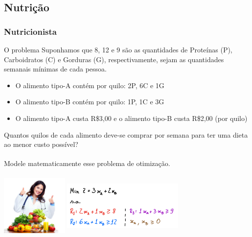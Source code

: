 \documentclass{beamer}
\begin{document}
\subsection{Nutrição}
\begin{frame}
	\frametitle{Nutricionista}
	\begin{block}{O problema}
		\scriptsize
		Suponhamos que 8, 12 e 9 são as quantidades de Proteínas (P), Carboidratos (C) e Gorduras (G), respectivamente, sejam as quantidades semanais mínimas de cada pessoa.
		\begin{itemize}
		\item O alimento tipo-A contém por quilo: 2P, 6C e 1G
		\item O alimento tipo-B contém por quilo: 1P, 1C e 3G
		\item O alimento tipo-A custa R\$3,00 e o alimento tipo-B custa R\$2,00 (por quilo)
		\end{itemize}  
		Quantos quilos de cada alimento deve-se comprar por semana para ter uma dieta ao menor custo possível? \\~\\
		Modele matematicamente esse problema de otimização.
	\end{block}
	{
		\centering
		\includegraphics[width=3.3cm,height=3.3cm]{nutricionista.jpg}
	}
	\only<2>
	{
		\centering
		\includegraphics[width=6cm,height=3.3cm]{Nutri_0.png}
	}
\end{frame}
\end{document}
